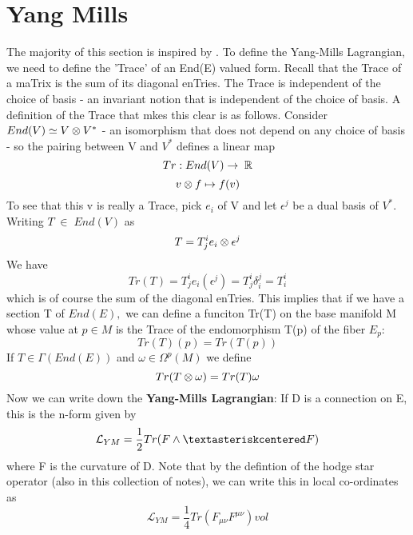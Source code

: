 \section{Yang Mills}
The majority of this section is inspired by \cite{john1994gauge}.
    To define the Yang-Mills Lagrangian, we need to define the 'Trace' of an End(E) valued form. Recall that the Trace
of a maTrix is the sum of its diagonal enTries. 
   The Trace is independent of the choice of basis - an invariant notion that is independent of the choice of basis. 
A definition of the Trace that mkes this clear is as follows. Consider $End(V) \simeq V \otimes V^*$ - an isomorphism that 
does not depend on any choice of basis - so the pairing between V and $V^*$ defines a linear map
\begin{equation*}
 Tr: End(V) \rightarrow \; \mathbb{R} \end{equation*} \begin{equation*}
   v \otimes f \mapsto f(v)
\end{equation*}
To see that this v is really a Trace, pick $e_i$ of V and let $\epsilon^j$ be a dual basis of $V^*$.
 Writing $T \;\in\; End(V)$ as 
\begin{equation*}
 T = T^i_j e_i \otimes \epsilon^j
\end{equation*}
We have 
\begin{equation*}
 Tr(T) = T^i_je_i(\epsilon^j) = T^i_j \delta_i^j = T^i_i
\end{equation*}
which is of course the sum of the diagonal enTries.
  \newline This implies that if we have a section T of $End(E),$ we can define a funciton Tr(T) on the base manifold M
whose value at $p \in M$ is the Trace of the endomorphism T(p) of the fiber $E_p$:
\begin{equation*}
 Tr(T)(p) = Tr(T(p))
\end{equation*}
If $T \in \Gamma(End(E))$ and $\omega \in \Omega^p(M)$ we define 
$$Tr(T \otimes \omega) = Tr(T)\omega$$
Now we can write down the \textbf{Yang-Mills Lagrangian}: If D is a connection on E, this is the n-form given by 
\begin{equation}
 \mathcal{L}_{YM} = \frac{1}{2} Tr(F \wedge \textasteriskcentered F)
\end{equation}
where F is the curvature of D.
Note that by the defintion of the hodge star operator (also in this collection of notes), we can write this 
in local co-ordinates as 
\begin{equation}
 \mathcal{L}_{YM} = \frac{1}{4} Tr (F_{\mu \nu}F^{\mu \nu})vol
\end{equation}
